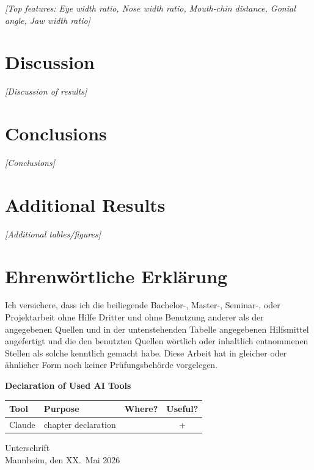 \documentclass[a4paper,oneside,bibliography=totoc]{scrbook}
\begin{document}
\textit{[Top features: Eye width ratio, Nose width ratio, Mouth-chin distance, Gonial angle, Jaw width ratio]}

\chapter{Discussion}

\textit{[Discussion of results]}

\chapter{Conclusions}

\textit{[Conclusions]}



\appendix

\chapter{Additional Results}

\textit{[Additional tables/figures]}

\backmatter

\chapter{Ehrenwörtliche Erklärung}

Ich versichere, dass ich die beiliegende Bachelor-, Master-, Seminar-, oder Projektarbeit ohne Hilfe Dritter und ohne Benutzung anderer als der angegebenen Quellen und in der untenstehenden Tabelle angegebenen Hilfsmittel angefertigt und die den benutzten Quellen wörtlich oder inhaltlich entnommenen Stellen als solche kenntlich gemacht habe. Diese Arbeit hat in gleicher oder ähnlicher Form noch keiner Prüfungsbehörde vorgelegen.

\begin{center}
  \textbf{Declaration of Used AI Tools} \\[.3em]
  \begin{tabularx}{\textwidth}{lXlc}
    \toprule
    Tool & Purpose & Where? & Useful? \\
    \midrule
    Claude & chapter declaration &  & + \\
    \bottomrule
  \end{tabularx}
\end{center}

\vspace{2cm}
\noindent Unterschrift\\
\noindent Mannheim, den XX.~Mai 2026 \hfill
\end{document}
